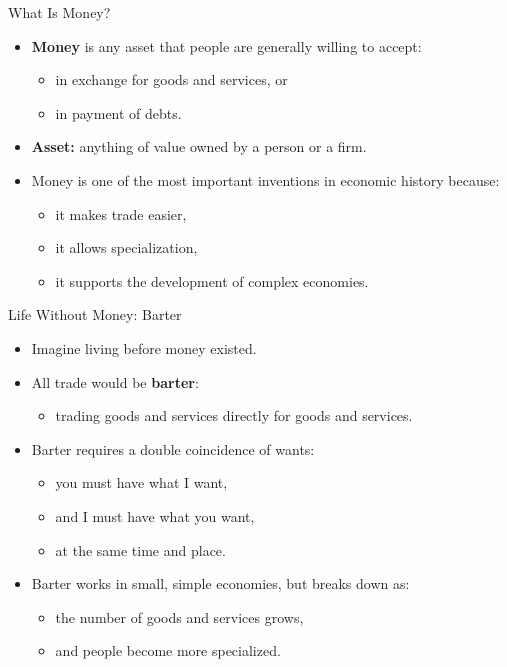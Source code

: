 \documentclass[aspectratio=169]{beamer}
\begin{document}
\begin{frame}{What Is Money?}
\transfade
\begin{itemize}
  \item \textbf{Money} is \alert{any asset} that people are generally willing to accept:
  \begin{itemize}
    \item in exchange for goods and services, or
    \item in payment of debts.
  \end{itemize}
  \item \textbf{Asset:} anything of value owned by a person or a firm.
  \item Money is one of the most important inventions in economic history because:
  \begin{itemize}
    \item it makes trade easier,
    \item it allows specialization,
    \item it supports the development of complex economies.
  \end{itemize}
\end{itemize}
\end{frame}

\begin{frame}{Life Without Money: Barter}
\transfade
\begin{itemize}
  \item Imagine living before money existed.
  \item All trade would be \textbf{barter}:
  \begin{itemize}
    \item trading goods and services directly for goods and services.
  \end{itemize}
  \item Barter requires a \alert{double coincidence of wants}:
  \begin{itemize}
    \item you must have what I want,
    \item and I must have what you want,
    \item at the same time and place.
  \end{itemize}
  \item Barter works in small, simple economies, but breaks down as:
  \begin{itemize}
    \item the number of goods and services grows,
    \item and people become more specialized.
  \end{itemize}
\end{itemize}
\end{frame}
\end{document}
